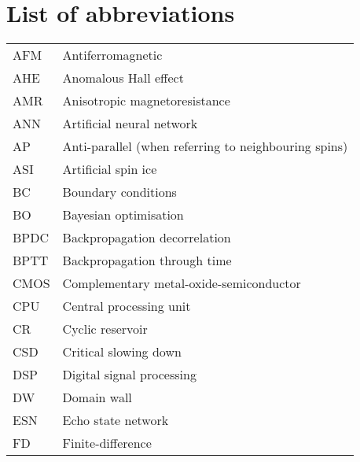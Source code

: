 \chapter{List of abbreviations}
{ %
    \addtolength{\skip\footins}{1pc}
    \begin{longtable}[l]{ll}
        AFM   & Antiferromagnetic                          \\
        AHE   & Anomalous Hall effect                       \\
        AMR   & Anisotropic magnetoresistance               \\
        ANN   & Artificial neural network                   \\
        AP    & Anti-parallel (when referring to neighbouring spins) \\
        ASI   & Artificial spin ice                         \\
        BC    & Boundary conditions                         \\
        BO    & Bayesian optimisation                       \\
        BPDC  & Backpropagation decorrelation               \\
        BPTT  & Backpropagation through time                \\
        CMOS  & Complementary metal-oxide-semiconductor     \\
        CPU   & Central processing unit                     \\
        CR    & Cyclic reservoir                            \\
        CSD   & Critical slowing down                       \\
        DSP   & Digital signal processing                   \\
        DW    & Domain wall                                 \\
        ESN   & Echo state network                          \\
        FD    & Finite-difference                           \\

\end{longtable}}
